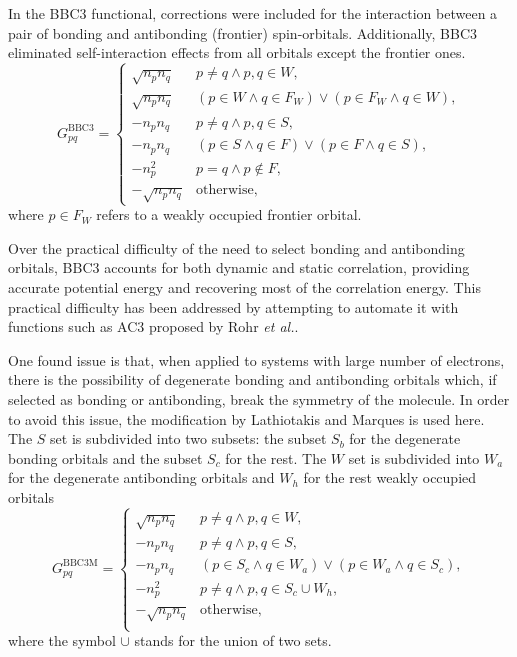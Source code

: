 In the BBC3 functional, corrections were included for the interaction between a pair 
of bonding and antibonding (frontier) spin-orbitals.
Additionally, BBC3 eliminated self-interaction effects from all orbitals except
the frontier ones.
\begin{equation} \label{eq:GBBC3}
    G_{pq}^{\text{BBC3}} =
    \begin{cases}
        \sqrt{n_p n_q} &
        p\not=q \wedge p,q \in W,
        \\
        \sqrt{n_p n_q} &
        \left( p \in W \wedge q \in F_W \right) \vee
        \left( p \in F_W \wedge q \in W \right),
        \\
        -n_p n_q &
        p\not=q \wedge p,q \in S,
        \\
        -n_p n_q &
        \left( p \in S \wedge q \in F \right) \vee
        \left( p \in F \wedge q \in S \right),
        \\
        -n_p^{2} & p=q \wedge p\not\in F, \\
        - \sqrt{n_p n_q} & \text{otherwise},
    \end{cases}
\end{equation}
where $p \in F_W$ refers to a weakly occupied frontier orbital.

Over the practical difficulty of the need to select bonding and antibonding
orbitals, BBC3 accounts for both dynamic and static correlation, providing 
accurate potential energy and recovering most of the correlation energy. 
This practical difficulty has been addressed by attempting to automate it with
functions such as AC3 proposed by Rohr \textit{et al.}.

One found issue is that, when applied to systems with large number of
electrons, there is the possibility of degenerate bonding and antibonding
orbitals which, if selected as bonding or antibonding, break the symmetry
of the molecule.
In order to avoid this issue, the modification by Lathiotakis and 
Marques is used here.
The $S$ set is subdivided into
two subsets: the subset $S_b$ for the degenerate bonding orbitals and the subset
$S_c$ for the rest. The $W$ set is subdivided into $W_a$ for the degenerate
antibonding orbitals and $W_h$ for the rest weakly occupied orbitals
\begin{equation} \label{eq:GBBC3M}
    G_{pq}^{\text{BBC3M}} = 
    \begin{cases}
        \sqrt{n_p n_q} & p \not= q \wedge p,q \in W, \\
        -n_p n_q & p \not= q \wedge p,q \in S, \\
        -n_p n_q & \left( p \in S_c \wedge q \in W_a \right) \vee \left( p \in W_a \wedge q \in S_c \right), \\
        -n_p^{2} & p \not= q \wedge p,q \in S_c \cup W_h, \\
        -\sqrt{n_p n_q} & \text{otherwise}, \\
    \end{cases}
\end{equation}
where the symbol $\cup$ stands for the union of two sets.

